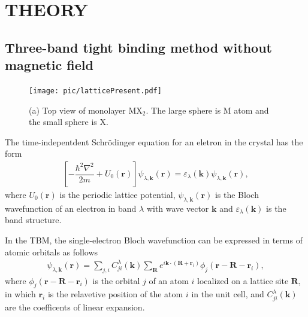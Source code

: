 \documentclass{report}
\newcommand{\f}[2]{\dfrac{#1}{#2}}
\begin{document}
\chapter{\textbf{THEORY}}
\section{Three-band tight binding method without magnetic field}\label{Section 2}
\begin{figure}[H]
	\centering
	\texttt{[image: pic/latticePresent.pdf]}
	\caption[TMD structure and its first Brillouin zone.]{\label{fig:Lattice}(a) Top view of monolayer MX$_{2}$. The large sphere is M atom and the small sphere is X.}
\end{figure}
The time-indepentdent Schr\"{o}dinger equation for an eletron in the crystal has the form
\begin{gather}
	\left[-\f{\hbar^{2} \nabla^{2}}{2m} + U_{0}(\mathbf{r})\right] \psi_{\lambda,\mathbf{k}}(\mathbf{r}) = \varepsilon_{\lambda}(\mathbf{k}) \psi_{\lambda,\mathbf{k}}(\mathbf{r}),
\end{gather}
where $U_{0}(\mathbf{r})$ is the periodic lattice potential, $\psi_{\lambda,\mathbf{k}}(\mathbf{r})$ is the Bloch wavefunction of an electron in band $\lambda$ with wave vector $\mathbf{k}$ and $\varepsilon_{\lambda}(\mathbf{k})$ is the band structure.

In the \acf{TBM}, the single-electron Bloch wavefunction can be expressed in terms of atomic orbitals as follows
\begin{gather}
	\psi_{\lambda,\mathbf{k}}(\mathbf{r}) = \sum_{j,i} C_{ji}^{\lambda}(\mathbf{k}) \sum_{\mathbf{R}} e^{i\mathbf{k}\cdot(\mathbf{R}+\mathbf{r}_{i})} \phi_{j}(\mathbf{r} - \mathbf{R} - \mathbf{r}_{i}),
\end{gather}
where $\phi_{j}(\mathbf{r} - \mathbf{R} - \mathbf{r}_{i})$ is the orbital $j$ of an atom $i$ localized on a lattice site $\mathbf{R}$, in which $\mathbf{r}_{i}$ is the relavetive position of the atom $i$ in the unit cell, and $C_{ji}^{\lambda}(\mathbf{k})$ are the coefficents of linear expansion.
\end{document}

